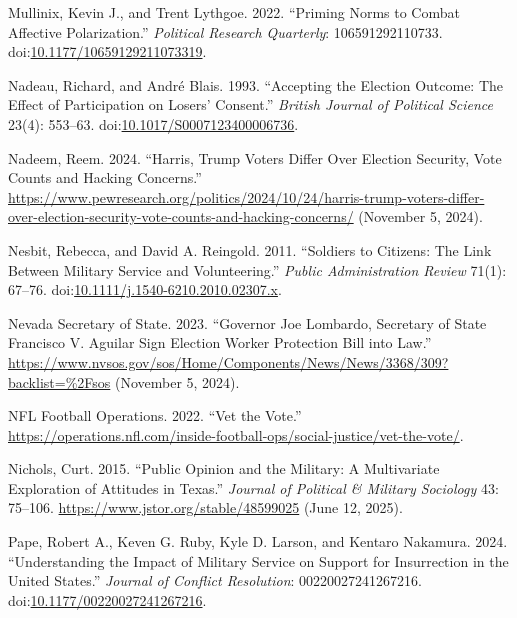 \documentclass[
  12pt,
  letterpaper,
]{article}
\newlength{\cslhangindent}
\newenvironment{CSLReferences}[2] %
 {\begin{list}{}{%
  \setlength{\itemindent}{0pt}
  \setlength{\leftmargin}{0pt}
  \setlength{\parsep}{0pt}
  \ifodd #1
   \setlength{\leftmargin}{\cslhangindent}
   \setlength{\itemindent}{-1\cslhangindent}
  \fi
  \setlength{\itemsep}{#2\baselineskip}}}
 {\end{list}}
\begin{document}
\begin{CSLReferences}{1}{1}
Mullinix, Kevin J., and Trent Lythgoe. 2022. {``Priming {Norms} to
{Combat Affective Polarization}.''} \emph{Political Research Quarterly}:
106591292110733.
doi:\href{https://doi.org/10.1177/10659129211073319}{10.1177/10659129211073319}.

Nadeau, Richard, and André Blais. 1993. {``Accepting the {Election
Outcome}: {The Effect} of {Participation} on {Losers}' {Consent}.''}
\emph{British Journal of Political Science} 23(4): 553--63.
doi:\href{https://doi.org/10.1017/S0007123400006736}{10.1017/S0007123400006736}.

Nadeem, Reem. 2024. {``Harris, {Trump Voters Differ Over Election
Security}, {Vote Counts} and {Hacking Concerns}.''}
\url{https://www.pewresearch.org/politics/2024/10/24/harris-trump-voters-differ-over-election-security-vote-counts-and-hacking-concerns/}
(November 5, 2024).

Nesbit, Rebecca, and David A. Reingold. 2011. {``Soldiers to {Citizens}:
{The Link} Between {Military Service} and {Volunteering}.''}
\emph{Public Administration Review} 71(1): 67--76.
doi:\href{https://doi.org/10.1111/j.1540-6210.2010.02307.x}{10.1111/j.1540-6210.2010.02307.x}.

Nevada Secretary of State. 2023. {``Governor {Joe Lombardo}, {Secretary}
of {State Francisco V}. {Aguilar} Sign {Election Worker Protection Bill}
into Law.''}
\url{https://www.nvsos.gov/sos/Home/Components/News/News/3368/309?backlist=\%2Fsos}
(November 5, 2024).

NFL Football Operations. 2022. {``Vet the {Vote}.''}
\url{https://operations.nfl.com/inside-football-ops/social-justice/vet-the-vote/}.

Nichols, Curt. 2015. {``Public {Opinion} and the {Military}: {A
Multivariate Exploration} of {Attitudes} in {Texas}.''} \emph{Journal of
Political \& Military Sociology} 43: 75--106.
\url{https://www.jstor.org/stable/48599025} (June 12, 2025).

Pape, Robert A., Keven G. Ruby, Kyle D. Larson, and Kentaro Nakamura.
2024. {``Understanding the {Impact} of {Military Service} on {Support}
for {Insurrection} in the {United States}.''} \emph{Journal of Conflict
Resolution}: 00220027241267216.
doi:\href{https://doi.org/10.1177/00220027241267216}{10.1177/00220027241267216}.


\end{CSLReferences}
\end{document}
